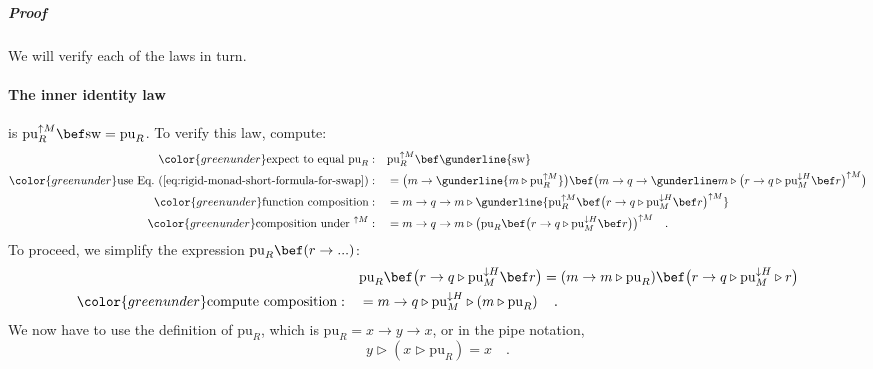 \subparagraph{Proof}

We will verify each of the laws in turn.

\paragraph{The inner identity law}

is $\text{pu}_{R}^{\uparrow M}\bef\text{sw}=\text{pu}_{R}$. To verify
this law, compute:
\begin{align}
{\color{greenunder}\text{expect to equal }\text{pu}_{R}:}\quad & \text{pu}_{R}^{\uparrow M}\bef\gunderline{\text{sw}}\nonumber \\
{\color{greenunder}\text{use Eq.~(\ref{eq:rigid-monad-short-formula-for-swap})}:}\quad & =\big(m\rightarrow\gunderline{m\triangleright\text{pu}_{R}^{\uparrow M}}\big)\bef\big(m\rightarrow q\rightarrow\gunderline m\triangleright\big(r\rightarrow q\triangleright\text{pu}_{M}^{\downarrow H}\bef r\big)^{\uparrow M}\big)\nonumber \\
{\color{greenunder}\text{function composition}:}\quad & =m\rightarrow q\rightarrow m\triangleright\gunderline{\text{pu}_{R}^{\uparrow M}\bef\big(r\rightarrow q\triangleright\text{pu}_{M}^{\downarrow H}\bef r\big)^{\uparrow M}}\nonumber \\
{\color{greenunder}\text{composition under }^{\uparrow M}:}\quad & =m\rightarrow q\rightarrow m\triangleright\big(\text{pu}_{R}\bef\big(r\rightarrow q\triangleright\text{pu}_{M}^{\downarrow H}\bef r\big)\big)^{\uparrow M}\quad.\label{eq:swap-laws-derivation1a}
\end{align}
To proceed, we simplify the expression $\text{pu}_{R}\bef(r\rightarrow...)$:
\begin{align}
 & \text{pu}_{R}\bef\big(r\rightarrow q\triangleright\text{pu}_{M}^{\downarrow H}\bef r\big)=(m\rightarrow m\triangleright\text{pu}_{R})\bef\big(r\rightarrow q\triangleright\text{pu}_{M}^{\downarrow H}\triangleright r\big)\nonumber \\
{\color{greenunder}\text{compute composition}:}\quad & =m\rightarrow q\triangleright\text{pu}_{M}^{\downarrow H}\triangleright\left(m\triangleright\text{pu}_{R}\right)\quad.\label{eq:swap-laws-derivation1}
\end{align}
We now have to use the definition of $\text{pu}_{R}$, which is $\text{pu}_{R}=x\rightarrow y\rightarrow x$,
or in the pipe notation, 
\begin{equation}
y\triangleright\left(x\triangleright\text{pu}_{R}\right)=x\quad.\label{eq:rigid-monad-pure-t-simplification-1}
\end{equation}
